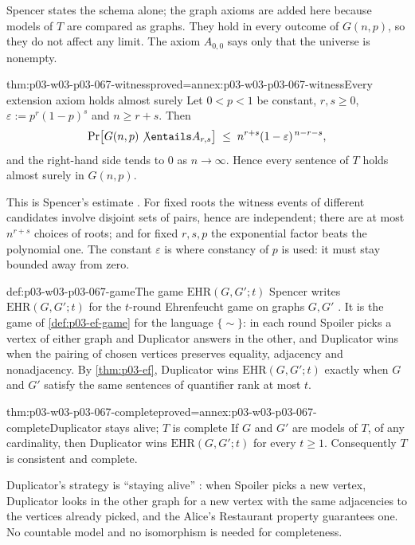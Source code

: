 Spencer states the schema alone; the graph axioms are added here because
models of \(T\) are compared as graphs.  They hold in every outcome of
\(G(n,p)\), so they do not affect any limit.  The axiom \(A_{0,0}\) says only
that the universe is nonempty.

\begin{hbtheorem}{thm:p03-w03-p03-067-witness}{proved=annex:p03-w03-p03-067-witness}{Every extension axiom holds almost surely}
Let \(0<p<1\) be constant, \(r,s\geq0\), \(\varepsilon:=p^r(1-p)^s\) and
\(n\geq r+s\).  Then
\[
 \Pr\bigl[G(n,p)\not\entails A_{r,s}\bigr]\;\leq\;
 n^{r+s}(1-\varepsilon)^{\,n-r-s},
\]
and the right-hand side tends to \(0\) as \(n\to\infty\).  Hence every
sentence of \(T\) holds almost surely in \(G(n,p)\).
\end{hbtheorem}

This is Spencer's estimate \cite[p.~13]{Spencer2007LogicRandomStructuresAuthor}.
For fixed roots the witness events of different candidates involve disjoint
sets of pairs, hence are independent; there are at most \(n^{r+s}\) choices of
roots; and for fixed \(r,s,p\) the exponential factor beats the polynomial one.
The constant \(\varepsilon\) is where constancy of \(p\) is used: it must stay
bounded away from zero.

\begin{hbconvention}{def:p03-w03-p03-067-game}{The game \(\mathrm{EHR}(G,G';t)\)}
Spencer writes \(\mathrm{EHR}(G,G';t)\) for the \(t\)-round
Ehrenfeucht game on graphs \(G,G'\)
\cite[p.~26]{Spencer2007LogicRandomStructuresAuthor}.  It is the game of
\cref{def:p03-ef-game} for the language \(\{\sim\}\): in each round Spoiler
picks a vertex of either graph and Duplicator answers in the other, and
Duplicator wins when the pairing of chosen vertices preserves equality,
adjacency and nonadjacency.  By \cref{thm:p03-ef}, Duplicator wins
\(\mathrm{EHR}(G,G';t)\) exactly when \(G\) and \(G'\) satisfy the same
sentences of quantifier rank at most \(t\).
\end{hbconvention}

\begin{hbtheorem}{thm:p03-w03-p03-067-complete}{proved=annex:p03-w03-p03-067-complete}{Duplicator stays alive; \(T\) is complete}
If \(G\) and \(G'\) are models of \(T\), of any cardinality, then Duplicator
wins \(\mathrm{EHR}(G,G';t)\) for every \(t\geq1\).  Consequently \(T\) is
consistent and complete.
\end{hbtheorem}

Duplicator's strategy is ``staying alive''
\cite[p.~13]{Spencer2007LogicRandomStructuresAuthor}: when Spoiler picks a
new vertex, Duplicator looks in the other graph for a new vertex with the same
adjacencies to the vertices already picked, and the Alice's Restaurant
property guarantees one.  No countable model and no isomorphism is needed for
completeness.

